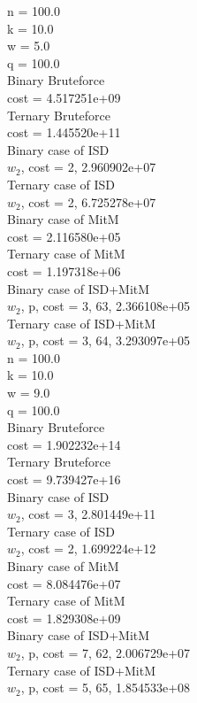 \documentclass[12pt]{article}
\begin{document}
n = 100.0 \\
k = 10.0 \\
w = 5.0 \\
q = 100.0 \\
Binary Bruteforce \\
cost = 4.517251e+09 \\
Ternary Bruteforce \\
cost = 1.445520e+11 \\
Binary case of ISD \\
$w_2$, cost = 2, 2.960902e+07 \\
Ternary case of ISD \\
$w_2$, cost = 2, 6.725278e+07 \\
Binary case of MitM \\
cost = 2.116580e+05 \\
Ternary case of MitM \\
cost = 1.197318e+06 \\
Binary case of ISD+MitM \\
$w_2$, p, cost = 3, 63, 2.366108e+05 \\
Ternary case of ISD+MitM \\
$w_2$, p, cost = 3, 64, 3.293097e+05 \\



n = 100.0 \\
k = 10.0 \\
w = 9.0 \\
q = 100.0 \\
Binary Bruteforce \\
cost = 1.902232e+14 \\
Ternary Bruteforce \\
cost = 9.739427e+16 \\
Binary case of ISD \\
$w_2$, cost = 3, 2.801449e+11 \\
Ternary case of ISD \\
$w_2$, cost = 2, 1.699224e+12 \\
Binary case of MitM \\
cost = 8.084476e+07 \\
Ternary case of MitM \\
cost = 1.829308e+09 \\
Binary case of ISD+MitM \\
$w_2$, p, cost = 7, 62, 2.006729e+07 \\
Ternary case of ISD+MitM \\
$w_2$, p, cost = 5, 65, 1.854533e+08 \\
\end{document}
